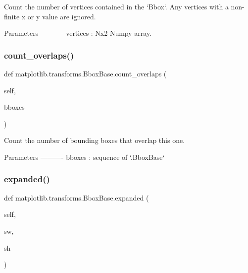 \begin{DoxyVerb}Count the number of vertices contained in the `Bbox`.
Any vertices with a non-finite x or y value are ignored.

Parameters
----------
vertices : Nx2 Numpy array.
\end{DoxyVerb}
 \mbox{\label{classmatplotlib_1_1transforms_1_1BboxBase_ab92a4ef72794910c3364d3fbf7a7ebee}} 
\subsubsection{\texorpdfstring{count\+\_\+overlaps()}{count\_overlaps()}}
{\footnotesize\ttfamily def matplotlib.\+transforms.\+Bbox\+Base.\+count\+\_\+overlaps (\begin{DoxyParamCaption}\item[{}]{self,  }\item[{}]{bboxes }\end{DoxyParamCaption})}

\begin{DoxyVerb}Count the number of bounding boxes that overlap this one.

Parameters
----------
bboxes : sequence of `.BboxBase`
\end{DoxyVerb}
 \mbox{\label{classmatplotlib_1_1transforms_1_1BboxBase_af70f4cac095c9a0d89482262c9e56bb3}} 
\subsubsection{\texorpdfstring{expanded()}{expanded()}}
{\footnotesize\ttfamily def matplotlib.\+transforms.\+Bbox\+Base.\+expanded (\begin{DoxyParamCaption}\item[{}]{self,  }\item[{}]{sw,  }\item[{}]{sh }\end{DoxyParamCaption})}

